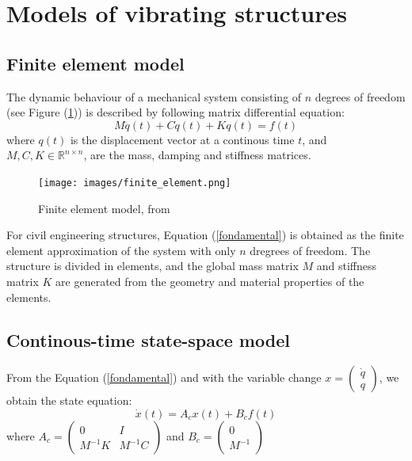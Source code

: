 \documentclass[journal]{IEEEtran}
\begin{document}
\section{Models of vibrating structures}%

\subsection{Finite element model}

The dynamic behaviour of a mechanical system consisting of $n$ degrees of freedom (see Figure (\ref{finite_el})) is described by following matrix differential equation:
\begin{equation}
M \ddot{q}(t) + C \dot{q}(t) + K q(t) = f(t)
\label{fondamental}
\end{equation}
where $q(t)$ is the displacement vector at a continous time $t$, and $M, C, K \in \mathbb{R}^{n \times n}$, are the mass, damping and stiffness matrices. 


\begin{figure}[h!]
  \centering
  \texttt{[image: images/finite\_element.png]}
  \caption{Finite element model, from \cite{peeters2000system}}
  \label{finite_el}
\end{figure}

For civil engineering structures, Equation (\ref{fondamental}) is obtained as the finite element approximation of the system with only $n$ dregrees of freedom.
The structure is divided in elements, and the global mass matrix $M$ and stiffness matrix $K$ are generated from the geometry and material
properties of the elements.

\subsection{Continous-time state-space model} %

From the Equation (\ref{fondamental}) and with the variable change $x =
\begin{pmatrix}
\dot{q} \\
q
\end{pmatrix}$, we obtain the state equation:
\begin{equation}
\dot{x}(t) = A_cx(t) + B_cf(t)
\end{equation}
 where
$A_c =
\begin{pmatrix}
0 & I \\
M^{-1}K & M^{-1}C
\end{pmatrix}$
and
$B_c=
\begin{pmatrix}
0 \\
M^{-1}
\end{pmatrix}$
\end{document}
